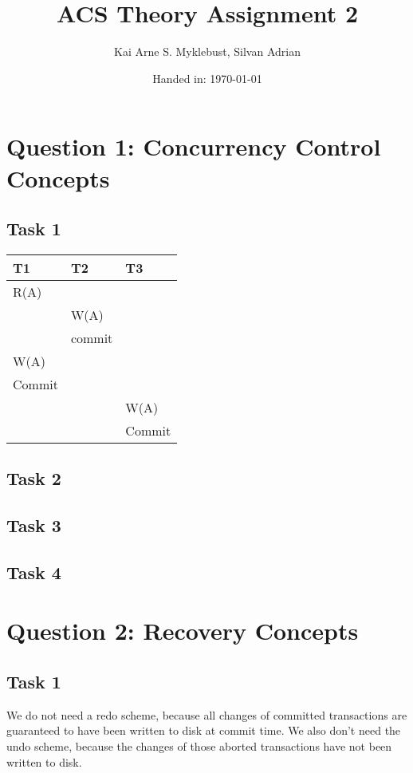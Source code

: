 \documentclass[12pt,a4paper]{article}
\begin{document}
\title{ACS Theory Assignment 2}
\subtitle{}

\author{Kai Arne S. Myklebust, Silvan Adrian}
\date{Handed in: \today}
	
\maketitle
\tableofcontents

\section{Question 1: Concurrency Control Concepts}

\subsection{Task 1}

\begin{table}[!htbp]
    \centering
    \begin{tabularx}{\textwidth}{l|l|l}
        \hline
        T1 & T2 & T3 \\ 
        \hline
        R(A) &  &  \\
             & W(A) & \\
             & commit & \\
        W(A) & & \\
        Commit & & \\
        		& & W(A) \\
        		& & Commit \\     
        \hline
    \end{tabularx}
\end{table}

\subsection{Task 2}

\subsection{Task 3}
\subsection{Task 4}

\section{Question 2: Recovery Concepts}
\subsection{Task 1}
We do not need a redo scheme, because all changes of committed transactions are guaranteed to have been written to disk at commit time.
We also don't need the undo scheme, because the changes of those aborted transactions have not been written to disk.
\end{document}
